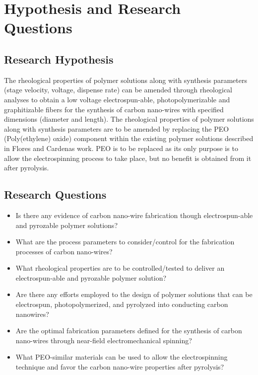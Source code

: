 
\chapter{Hypothesis and Research Questions} %

\label{Chapter:HypothesisandResearchQuestions}


\section{Research Hypothesis}

The rheological properties of polymer solutions along with synthesis parameters (stage velocity, voltage, dispense rate) can be amended through rheological analyses to obtain a low voltage electrospun-able, photopolymerizable and graphitizable fibers for the synthesis of carbon nano-wires with specified dimensions (diameter and length). The rheological properties of polymer solutions along with synthesis parameters are to be amended by replacing the PEO (Poly(ethylene) oxide) component within the existing polymer solutions described in Flores \cite{Flores2017} and Cardenas \cite{Cardenas2017} work. PEO is to be replaced as its only purpose is to allow the electrospinning process to take place, but no benefit is obtained from it after pyrolysis.

\section{Research Questions}

\begin{itemize}
	\item{
	Is there any evidence of carbon nano-wire fabrication though electrospun-able and pyrozable polymer solutions?
	}
	\item{
	What are the process parameters to consider/control for the fabrication processes of carbon nano-wires? 
	}
	\item{
	What rheological properties are to be controlled/tested to deliver an electrospun-able and pyrozable polymer solution?	
	}
	\item{
	Are there any efforts employed to the design of polymer solutions that can be electrospun, photopolymerized, and pyrolyzed into conducting carbon nanowires?
	}
	\item{
	Are the optimal fabrication parameters defined \cite{Cardenas2017} for the synthesis of carbon nano-wires through near-field electromechanical spinning?	
	}
	\item{
	What PEO-similar materials can be used to allow the electrospinning technique and favor the carbon nano-wire properties after pyrolysis? 
	}
\end{itemize}






